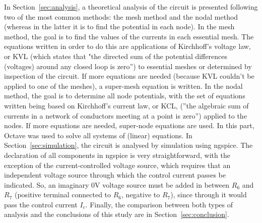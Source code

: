 \par
In Section~\ref{sec:analysis}, a theoretical analysis of the circuit is presented following two of the most common methods: the mesh method and the nodal method (whereas in the latter it is to find the potential in each node). In the mesh method, the goal is to find the values of the currents in each essential mesh. The equations written in order to do this are applications of Kirchhoff's voltage law, or KVL (which states that "the directed sum of the potential differences (voltages) around any closed loop is zero'') to essential meshes or determined by inspection of the circuit. If more equations are needed (because KVL couldn't be applied to one of the meshes), a super-mesh equation is written. In the nodal method, the goal is to determine all node potentials, with the set of equations written being based on Kirchhoff's current law, or KCL, (''the algebraic sum of currents in a network of conductors meeting at a point is zero'') applied to the nodes. If more equations are needed, super-node equations are used. In this part, Octave was used to solve all systems of (linear) equations. In Section~\ref{sec:simulation}, the circuit is analysed by simulation using ngspice. The declaration of all components in ngspice is very straightforward, with the exception of the current-controlled voltage source, which requires that an independent voltage source through which the control current passes be indicated. So, an imaginary 0V voltage source must be added in between $R_6$ and $R_7$ (positive terminal connected to $R_6$, negative to $R_7$), since through it would pass the control current $I_c$. Finally, the comparison between both types of analysis and the conclusions of this study are in Section~\ref{sec:conclusion}.

